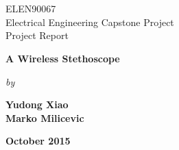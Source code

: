 \chapter*{}

\thispagestyle{empty}

\begin{center}
ELEN90067 \\
Electrical Engineering Capstone Project \\
Project Report
\end{center}

\vspace{1cm}

\begin{center}
\Large{ \bf  A Wireless Stethoscope}
\end{center}

\vspace{1cm}
\begin{center}
{\it by }
\end{center}
\vspace{1cm}

\begin{center}
\bf{ 
Yudong Xiao \\
Marko Milicevic
}
\end{center}

\vspace{1cm}


\begin{center}
{\bf  October 2015 }
\end{center}

\vspace{1cm}
\begin{center}
 { } %
\end{center}